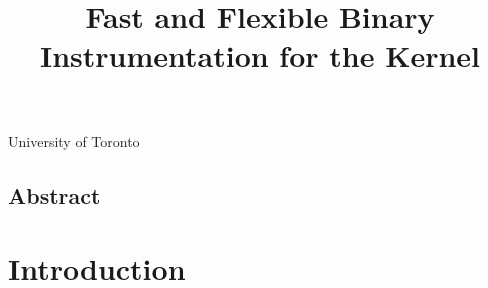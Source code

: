 \documentclass[preprint]{sigplanconf}
\begin{document}
\title{Fast and Flexible Binary Instrumentation for the Kernel}

{University of Toronto}{}

\maketitle
\subsection*{Abstract}


\section{Introduction}\label{sec:intro}
\end{document}
